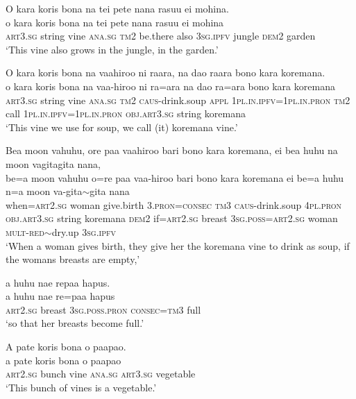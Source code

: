 \ea\label{ex:text7-25}
O kara koris bona na tei pete nana rasuu ei mohina.\\
\gll o	kara	koris	bona	na	tei	pete	nana	rasuu	ei	mohina\\
     \textsc{art}3.\textsc{sg}	string	vine	\textsc{ana}.\textsc{sg}	\textsc{tm}2	be.there	also	3\textsc{sg}.\textsc{ipfv}	jungle	\textsc{dem}2	garden\\
\glt `This vine also grows in the jungle, in the garden.'
\z

\ea\label{ex:text7-26}
O kara koris bona na vaahiroo ni raara, na dao raara bono kara koremana.\\
\gll o	kara	koris	bona	na	vaa-hiroo	ni	ra=ara	na	dao	ra=ara	bono	kara	koremana\\
     \textsc{art}3.\textsc{sg}	string	vine	\textsc{ana}.\textsc{sg}	\textsc{tm}2	\textsc{caus}-drink.soup	\textsc{appl}	1\textsc{pl}.\textsc{in}.\textsc{ipfv}=1\textsc{pl}.\textsc{in}.\textsc{pron}	\textsc{tm}2	call	1\textsc{pl}.\textsc{in}.\textsc{ipfv}=1\textsc{pl}.\textsc{in}.\textsc{pron}	\textsc{obj}.\textsc{art}3.\textsc{sg}	string	koremana\\
\glt `This vine we use for soup, we call (it) koremana vine.'
\z

\ea\label{ex:text7-27}
Bea moon vahuhu, ore paa vaahiroo bari bono kara koremana, ei bea huhu na moon vagitagita nana,\\
\gll be=a	moon	vahuhu	o=re	paa	vaa-hiroo	bari	bono	kara	koremana	ei	be=a	huhu	n=a	moon	va-gita{$\sim$}gita	nana\\
     when=\textsc{art}2.\textsc{sg}	woman	give.birth	3.\textsc{pron}=\textsc{consec}	\textsc{tm}3	\textsc{caus}-drink.soup	4\textsc{pl}.\textsc{pron}	\textsc{obj}.\textsc{art}3.\textsc{sg}	string	koremana	\textsc{dem}2	if=\textsc{art}2.\textsc{sg}	breast	3\textsc{sg}.\textsc{poss}=\textsc{art}2.\textsc{sg}	woman	\textsc{mult}-\textsc{red}{$\sim$}dry.up	3\textsc{sg}.\textsc{ipfv}\\
\glt `When a woman gives birth, they give her the koremana vine to drink as soup, if the womans breasts are empty,'
\z

\ea\label{ex:text7-28}
a huhu nae repaa hapus.\\
\gll a	huhu	nae	re=paa	hapus\\
     \textsc{art}2.\textsc{sg}	breast	3\textsc{sg}.\textsc{poss}.\textsc{pron}	\textsc{consec}=\textsc{tm}3	full\\
\glt `so that her breasts become full.'
\z

\ea\label{ex:text7-29}
A pate koris bona o paapao.\\
\gll a	pate	koris	bona	o	paapao\\
     \textsc{art}2.\textsc{sg}	bunch	vine	\textsc{ana}.\textsc{sg}	\textsc{art}3.\textsc{sg}	vegetable\\
\glt `This bunch of vines is a vegetable.'
\z


